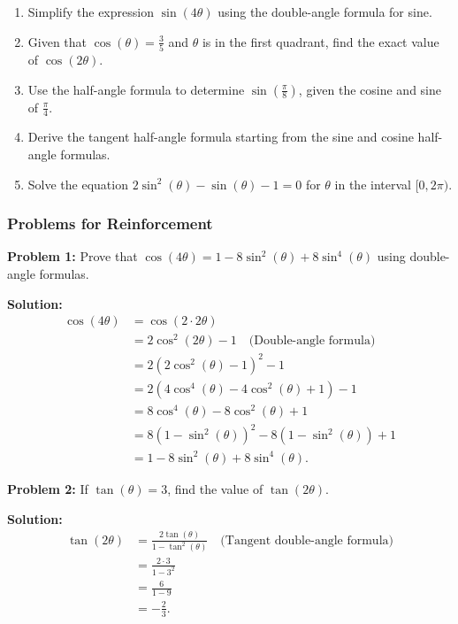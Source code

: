 \documentclass[a4paper,12pt]{book}
\newcounter{problem}
\begin{document}
\begin{enumerate}
    \item Simplify the expression $\sin(4\theta)$ using the double-angle formula for sine.
    \item Given that $\cos(\theta) = \frac{3}{5}$ and $\theta$ is in the first quadrant, find the exact value of $\cos(2\theta)$.
    \item Use the half-angle formula to determine $\sin\left(\frac{\pi}{8}\right)$, given the cosine and sine of $\frac{\pi}{4}$.
    \item Derive the tangent half-angle formula starting from the sine and cosine half-angle formulas.
    \item Solve the equation $2\sin^2(\theta) - \sin(\theta) - 1 = 0$ for $\theta$ in the interval $[0, 2\pi)$.
\end{enumerate}

\subsubsection{Problems for Reinforcement}
\label{subsubsec:problems_double_half_angle}

\textbf{Problem 1:} Prove that $\cos(4\theta) = 1 - 8\sin^2(\theta) + 8\sin^4(\theta)$ using double-angle formulas.

\textbf{Solution:}
\begin{align*}
\cos(4\theta) &= \cos(2\cdot2\theta) \\
&= 2\cos^2(2\theta) - 1 \quad \text{(Double-angle formula)} \\
&= 2(2\cos^2(\theta) - 1)^2 - 1 \\
&= 2(4\cos^4(\theta) - 4\cos^2(\theta) + 1) - 1 \\
&= 8\cos^4(\theta) - 8\cos^2(\theta) + 1 \\
&= 8(1 - \sin^2(\theta))^2 - 8(1 - \sin^2(\theta)) + 1 \\
&= 1 - 8\sin^2(\theta) + 8\sin^4(\theta).
\end{align*}

\textbf{Problem 2:} If $\tan(\theta) = 3$, find the value of $\tan(2\theta)$.

\textbf{Solution:}
\begin{align*}
\tan(2\theta) &= \frac{2\tan(\theta)}{1 - \tan^2(\theta)} \quad \text{(Tangent double-angle formula)} \\
&= \frac{2\cdot 3}{1 - 3^2} \\
&= \frac{6}{1 - 9} \\
&= -\frac{2}{3}.
\end{align*}
\end{document}
